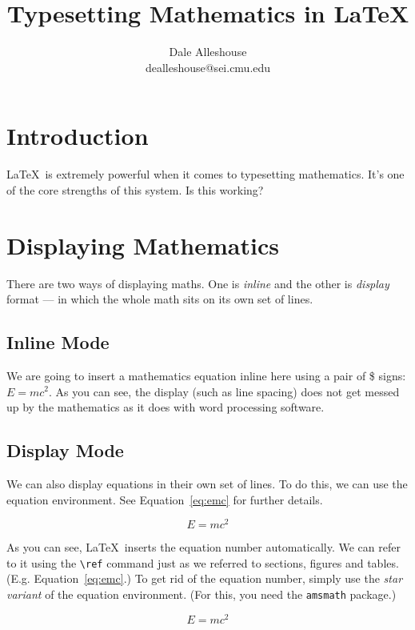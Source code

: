 \documentclass{article}
\begin{document}
\title{Typesetting Mathematics in \LaTeX}
\author{Dale Alleshouse \\ dealleshouse@sei.cmu.edu}
\maketitle

\section{Introduction}
\LaTeX\ is extremely powerful when it comes to typesetting mathematics. It's one of the core
strengths of this system. Is this working?

\section{Displaying Mathematics}
There are two ways of displaying maths. One is \emph{inline} and the other is \emph{display} format
— in which the whole math sits on its own set of lines.


\subsection{Inline Mode}
We are going to insert a mathematics equation inline here using a pair of \$ signs: $E=mc^2$. As you
can see, the display (such as line spacing) does not get messed up by the mathematics as it does
with word processing software.

\subsection{Display Mode}
We can also display equations in their own set of lines. To do this, we can use the equation
environment. See Equation~\ref{eq:emc} for further details.

\begin{equation}
  \label{eq:emc}
  E=mc^2
\end{equation}

As you can see, \LaTeX\ inserts the equation number automatically. We can refer to it using the
\verb|\ref| command just as we referred to sections, figures and tables. (E.g.
Equation~\ref{eq:emc}.) To get rid of the equation number, simply use the \emph{star variant} of the
equation environment. (For this, you need the \texttt{amsmath} package.)

\begin{equation*}
  E = mc^2
\end{equation*}
\end{document}
